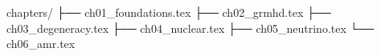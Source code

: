 chapters/
├── ch01_foundations.tex
├── ch02_grmhd.tex
├── ch03_degeneracy.tex
├── ch04_nuclear.tex
├── ch05_neutrino.tex
└── ch06_amr.tex